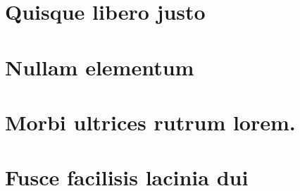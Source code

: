 \documentclass[
12pt,        %
openright,   %
twoside,     %
a4paper,     %
english,       %
brazil,        %
%
%
]{ppgca}
\begin{document}

\begin{apendicesenv}

\partapendices

\chapter{Quisque libero justo}

\lipsum[50]

\vfill

\pagebreak

\lipsum[51]

\chapter{Nullam elementum}
\lipsum[55-57]

\end{apendicesenv}

\begin{anexosenv}

\partanexos

\chapter{Morbi ultrices rutrum lorem.}
\lipsum[30]

\chapter{Fusce facilisis lacinia dui}

\lipsum[32]

\end{anexosenv}

\printindex
\end{document}
